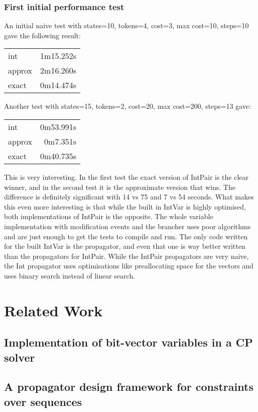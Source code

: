 \documentclass[a4paper,11pt]{article}
\begin{document}
\subsubsection{First initial performance test}
An initial naive test with states=10, tokens=4, cost=3, max cost=10, steps=10 gave the following result:
\newline
\begin{tabular}{l r}
int & 1m15.252s \\
approx & 2m16.260s \\ 
exact & 0m14.474s \\
\end{tabular}
\newline
Another test with states=15, tokens=2, cost=20, max cost=200, steps=13 gave:
\newline
\begin{tabular}{l r}
int & 0m53.991s \\
approx & 0m7.351s \\ 
exact & 0m40.735s \\
\end{tabular}
\newline
This is very interesting. In the first test the exact version of IntPair is the clear winner, and in the second test it is the approximate version that wins. The difference is definitely significant with 14 vs 75 and 7 vs 54 seconds. What makes this even more interesting is that while the built in IntVar is highly optimised, both implementations of IntPair is the opposite. The whole variable implementation with modification events and the brancher uses poor algorithms and are just enough to get the tests to compile and run. The only code written for the built IntVar is the propagator, and even that one is way better written than the propagators for IntPair. While the IntPair propagators are very naive, the Int propagator uses optimisations like preallocating space for the vectors and uses binary search instead of linear search.

\section{Related Work}
\subsection{Implementation of bit-vector variables in a CP solver}
\subsection{A propagator design framework for constraints over sequences}
\end{document}
